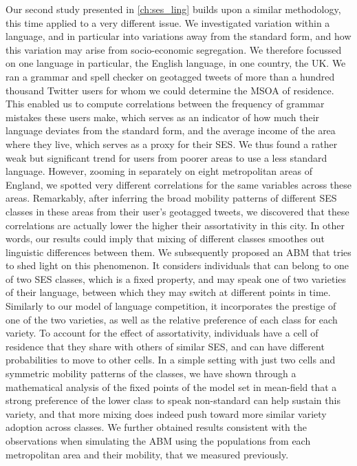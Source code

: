 \documentclass[../thesis.tex]{subfiles}
\begin{document}
Our second study presented in \cref{ch:ses_ling} builds upon a similar methodology, this
time applied to a very different issue. We investigated variation within a language, and
in particular into variations away from the standard form, and how this variation may
arise from socio-economic segregation. We therefore focussed on one language in
particular, the English language, in one country, the UK. We ran a grammar and spell
checker on geotagged tweets of more than a hundred thousand Twitter users for whom we
could determine the \ac{MSOA} of residence. This enabled us to compute correlations
between the frequency of grammar mistakes these users make, which serves as an indicator
of how much their language deviates from the standard form, and the average income of
the area where they live, which serves as a proxy for their \ac{SES}. We thus found a
rather weak but significant trend for users from poorer areas to use a less standard
language. However, zooming in separately on eight metropolitan areas of England, we
spotted very different correlations for the same variables across these areas.
Remarkably, after inferring the broad mobility patterns of different \ac{SES} classes in
these areas from their user's geotagged tweets, we discovered that these correlations
are actually lower the higher their assortativity in this city. In other words, our
results could imply that mixing of different classes smoothes out linguistic differences
between them. We subsequently proposed an \ac{ABM} that tries to shed light on this
phenomenon. It considers individuals that can belong to one of two \ac{SES} classes,
which is a fixed property, and may speak one of two varieties of their language, between
which they may switch at different points in time. Similarly to our model of language
competition, it incorporates the prestige of one of the two varieties, as well as the
relative preference of each class for each variety. To account for the effect of
assortativity, individuals have a cell of residence that they share with others of
similar \ac{SES}, and can have different probabilities to move to other cells. In a
simple setting with just two cells and symmetric mobility patterns of the classes, we
have shown through a mathematical analysis of the fixed points of the model set in
mean-field that a strong preference of the lower class to speak non-standard can help
sustain this variety, and that more mixing does indeed push toward more similar variety
adoption across classes. We further obtained results consistent with the observations
when simulating the \ac{ABM} using the populations from each metropolitan area and their
mobility, that we measured previously.
\end{document}
